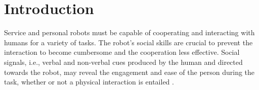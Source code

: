 





\section{Introduction}
Service and personal robots must be capable of cooperating and interacting with humans for a variety of tasks.
The robot's social skills are crucial to prevent the interaction to become cumbersome and the cooperation less effective.  
Social signals, i.e., verbal and non-verbal cues produced by the human and directed towards the robot, may reveal the engagement and ease of the person during the task, whether or not a physical interaction is entailed \cite{Anzalone2015engagement,ivaldi2014frontiers,Chen2014NARStouch}.

